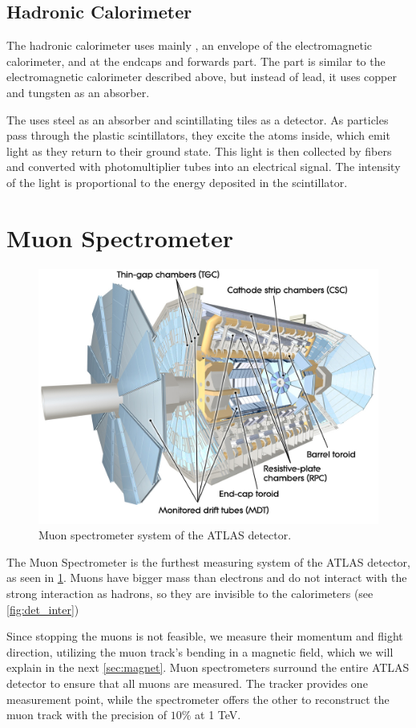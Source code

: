 \subsection{Hadronic Calorimeter}
The hadronic calorimeter uses mainly \TCal, an envelope of the electromagnetic calorimeter, and \LAr at the endcaps and forwards part.
The \LAr part is similar to the electromagnetic calorimeter described above, but instead of lead, it uses copper and tungsten as an absorber.

The \TCal uses steel as an absorber and scintillating tiles as a detector.
As particles pass through the plastic scintillators, they excite the atoms inside, which emit light as they return to their ground state.
This light is then collected by fibers and converted with photomultiplier tubes into an electrical signal.
The intensity of the light is proportional to the energy deposited in the scintillator.




\section{Muon Spectrometer}
\label{sec:muon}
\begin{figure}[htb]
    \centering
    \includegraphics[width=0.8\linewidth]{src/img/muon.jpg}
    \caption{Muon spectrometer system of the ATLAS detector.}
    \label{fig:muon}
\end{figure}

The Muon Spectrometer is the furthest measuring system of the ATLAS detector, as seen in \cref{fig:muon}.
Muons have bigger mass than electrons and do not interact with the strong interaction as hadrons, so they are invisible to the calorimeters (see \cref{fig:det_inter})

Since stopping the muons is not feasible, we measure their momentum and flight direction, utilizing the muon track's bending in a magnetic field, which we will explain in the next \cref{sec:magnet}.
Muon spectrometers surround the entire ATLAS detector to ensure that all muons are measured.
The tracker provides one measurement point, while the spectrometer offers the other to reconstruct the muon track with the precision of $10\%$ at 1 TeV.


